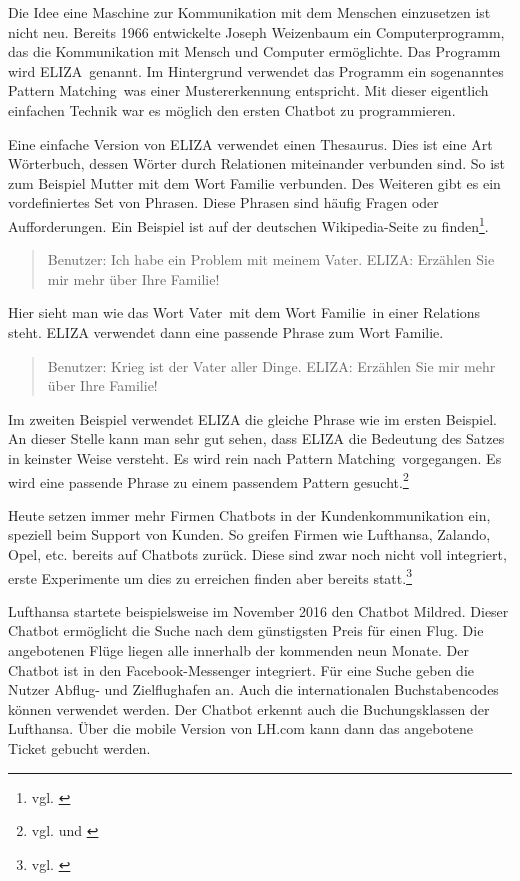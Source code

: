 Die Idee eine Maschine zur Kommunikation mit dem Menschen einzusetzen ist nicht neu. Bereits 1966 entwickelte Joseph Weizenbaum ein Computerprogramm, das die Kommunikation mit Mensch und Computer ermöglichte. Das Programm wird \glqq ELIZA\grqq\ genannt. Im Hintergrund verwendet das Programm ein sogenanntes \glqq Pattern Matching\grqq\, was einer Mustererkennung entspricht. Mit dieser eigentlich einfachen Technik war es möglich den ersten Chatbot zu programmieren. 

Eine einfache Version von ELIZA verwendet einen Thesaurus. Dies ist eine Art Wörterbuch, dessen Wörter durch Relationen miteinander verbunden sind. So ist zum Beispiel Mutter mit dem Wort Familie verbunden. Des Weiteren gibt es ein vordefiniertes Set von Phrasen. Diese Phrasen sind häufig Fragen oder Aufforderungen. Ein Beispiel ist auf der deutschen Wikipedia-Seite zu finden\footnote{vgl. \cite{WikiELIZADE}}. 
\begin{quote}
    Benutzer: Ich habe ein Problem mit meinem Vater.\newline
    ELIZA: Erzählen Sie mir mehr über Ihre Familie! 
\end{quote}
Hier sieht man wie das Wort \glqq Vater\grqq\ mit dem Wort \glqq Familie\grqq\ in einer Relations steht. ELIZA verwendet dann eine passende Phrase zum Wort \glqq Familie\grqq.
\begin{quote}    
    Benutzer: Krieg ist der Vater aller Dinge.\newline
    ELIZA: Erzählen Sie mir mehr über Ihre Familie!
\end{quote}    
Im zweiten Beispiel verwendet ELIZA die gleiche Phrase wie im ersten Beispiel. An dieser Stelle kann man sehr gut sehen, dass ELIZA die Bedeutung des Satzes in keinster Weise versteht. Es wird rein nach \glqq Pattern Matching\grqq\ vorgegangen. Es wird eine passende Phrase zu einem passendem Pattern gesucht.\footnote{vgl. \cite{WikiELIZADE} und \cite{WikiELIZA}}    

Heute setzen immer mehr Firmen Chatbots in der Kundenkommunikation ein, speziell beim Support von Kunden. So greifen Firmen wie Lufthansa, Zalando, Opel, etc. bereits auf Chatbots zurück. 
Diese sind zwar noch nicht voll integriert, erste Experimente um dies zu erreichen finden aber bereits statt.\footnote{vgl. \cite{UnternehmenChatbots}}

Lufthansa startete beispielsweise im November 2016 den Chatbot \glqq Mildred\grqq. Dieser Chatbot ermöglicht die Suche nach dem günstigsten Preis für einen Flug. Die angebotenen Flüge liegen alle innerhalb der kommenden neun Monate. Der Chatbot ist in den Facebook-Messenger integriert. Für eine Suche geben die Nutzer Abflug- und Zielflughafen an. Auch die internationalen Buchstabencodes können verwendet werden. Der Chatbot erkennt auch die Buchungsklassen der Lufthansa. Über die mobile Version von LH.com kann dann das angebotene Ticket gebucht werden. 

